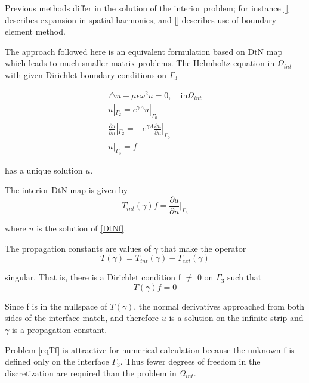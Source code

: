 Previous methods differ in the solution of the interior problem; for
instance \ref{} describes expansion in spatial harmonics, and \ref{}
describes use of boundary element method.

The approach followed here is an equivalent formulation based on DtN
map which leads to much smaller matrix problems. The Helmholtz
equation in $\Omega_{int}$ with given Dirichlet boundary conditions on
$\Gamma_3$

\begin{equation}
\begin{array}{ll}
\triangle u + \mu \epsilon \omega^2 u = 0, \quad \textrm{in}
\Omega_{int} \\
u|_{\Gamma_2} = e^{\gamma \Lambda} u|_{\Gamma_0} \\
\frac{\partial u}{\partial n} |_{\Gamma_2} = -e^{\gamma \Lambda}
 \frac{\partial u}{\partial n} |_{\Gamma_0} \\
u|_{\Gamma_3} = f
\end{array}
\label{DtNf}
\end{equation} 

has a unique solution $u$.

The interior DtN map is given by
\begin{equation}
  T_{int}(\gamma) f = \frac{\partial u}{\partial n} |_{\Gamma_3}
\end{equation} 

where $u$ is the solution of \ref{DtNf}.

The propagation constants are values of $\gamma$ that make the operator
\begin{equation}
T(\gamma) = T_{int}(\gamma) - T_{ext}(\gamma)
\label{eqTdiff}
\end{equation} 

singular. That is, there is a Dirichlet condition f $\neq$ 0 on
$\Gamma_3$ such that
\begin{equation}
T(\gamma) f = 0
\label{eqTf}
\end{equation}

Since f is in the nullspace of $T(\gamma)$, the normal derivatives
approached from both sides of the interface match, and therefore $u$
is a solution on the infinite strip and $\gamma$ is a propagation
constant.

Problem \ref{eqTf} is attractive for numerical calculation because the
unknown f is defined only on the interface $\Gamma_3$. Thus fewer
degrees of freedom in the discretization are required than the problem
in $\Omega_{int}$.

